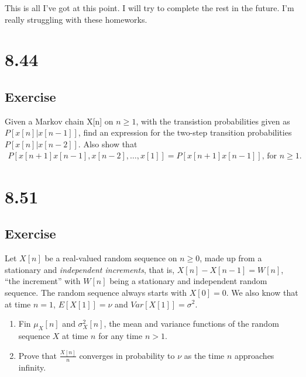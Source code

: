 \documentclass[12pt]{article}
\begin{document}
{\huge This is all I've got at this point. } I will try to complete the rest in the future. I'm really struggling with these homeworks.














\section{8.44} 
\subsection{Exercise}
Given a Markov chain X[n] on $n\geq1$, with the transistion probabilities given as $P\left[x[n]|x[n-1]\right]$, 
find an expression for the two-step transition probabilities $P\left[x[n]|x[n-2]\right]$.
Also show that
\begin{align*}
  P\left[x[n+1]x[n-1],x[n-2],\ldots,x[1]\right]=P\left[x[n+1]x[n-1]\right]\text{,   for } n\geq1.
\end{align*}
\newpage

\section{8.51} 
\subsection{Exercise}
Let $X[n]$ be a real-valued random sequence on $n\geq0$, made up from a stationary and \emph{independent increments}, that is, $X[n]-X[n-1]=W[n]$, ``the increment'' with $W[n]$ being a stationary and independent random sequence. The random sequence always starts
with $X[0]=0$. We also know that at time $n=1$, $E[X[1]]=\nu$ and $Var[X[1]]=\sigma^2$.
\begin{enumerate}[label=(\alph*)]
  \item Fin $\mu_X[n]$ and $\sigma^2_X[n]$, the mean and variance functions of the random 
sequence $X$ at time $n$ for any time $n>1$.
  \item Prove that $\frac{X[n]}{n}$ converges in probability to $\nu$ as the time 
$n$ approaches infinity.
\end{enumerate}
\newpage
\end{document}

